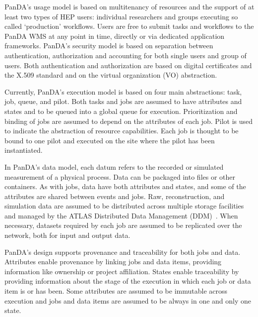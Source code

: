 PanDA's usage model is based on multitenancy of resources and the support of at
least two types of HEP users: individual researchers and groups executing so
called `production' workflows. Users are free to submit tasks and workflows to
the PanDA WMS at any point in time, directly or via dedicated application
frameworks. PanDA's security model is based on separation between
authentication, authorization and accounting for both single users and group of
users. Both authentication and authorization are based on digital certificates
and the X.509 standard and on the virtual organization (VO) abstraction.


Currently, PanDA's execution model is based on four main abstractions: task,
job, queue, and pilot. Both tasks and jobs are assumed to have attributes and
states and to be queued into a global queue for execution. Prioritization and
binding of jobs are assumed to depend on the attributes of each job. Pilot is
used to indicate the abstraction of resource capabilities. Each job is thought
to be bound to one pilot and executed on the site where the pilot has been
instantiated.

In PanDA's data model, each
datum refers to the recorded or simulated measurement of a physical
process.
Data can be packaged into files or other containers. As with jobs, data
have both attributes and states, and some of the attributes are shared between
events and jobs. Raw, reconstruction, and simulation data are assumed to be
distributed across multiple storage facilities and managed by the ATLAS
Distributed Data Management (DDM)~\cite{garonne2012atlas}. When necessary,
datasets required by each job are assumed to be replicated over the network,
both for input and output data.

PanDA's design supports provenance and traceability for both jobs and data.
Attributes enable provenance by linking jobs and data items, providing
information like ownership or project affiliation. States enable traceability by
providing information about the stage of the execution in which each job or data
item is or has been. Some attributes are assumed to be immutable across
execution and jobs and data items are assumed to be always in one and only one
state.


